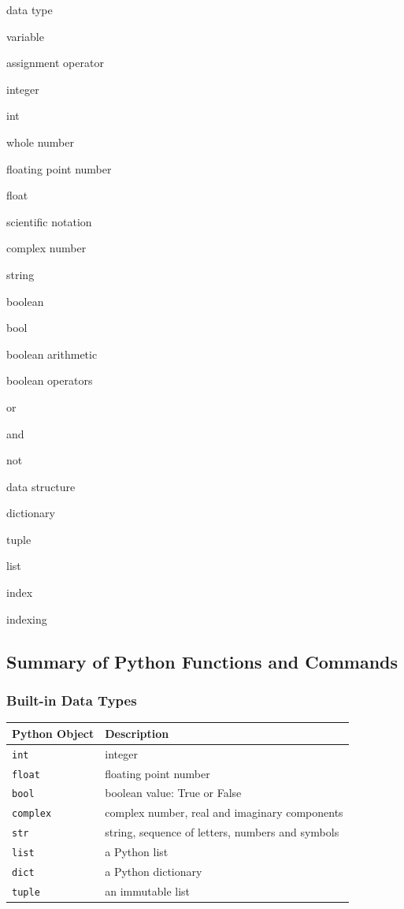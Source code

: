 \documentclass{book}
\newenvironment{key_terms}{\begin{multicols}{3}}{\end{multicols}} %
\begin{document}
    
        \begin{key_terms}
        data type

variable

assignment operator

integer

int

whole number

floating point number

float

scientific notation

complex number

string

boolean

bool

boolean arithmetic

boolean operators

or

and

not

data structure

dictionary

tuple

list

index

indexing
        \end{key_terms}

    




    
        \subsection{Summary of Python Functions and
Commands}\label{summary-of-python-functions-and-commands}
    




    
        \subsubsection{Built-in Data Types}\label{built-in-data-types}

\begin{longtable}[]{@{}ll@{}}
\toprule
Python Object & Description\tabularnewline
\midrule
\endhead
\lstinline!int! & integer\tabularnewline
\lstinline!float! & floating point number\tabularnewline
\lstinline!bool! & boolean value: True or False\tabularnewline
\lstinline!complex! & complex number, real and imaginary
components\tabularnewline
\lstinline!str! & string, sequence of letters, numbers and
symbols\tabularnewline
\lstinline!list! & a Python list\tabularnewline
\lstinline!dict! & a Python dictionary\tabularnewline
\lstinline!tuple! & an immutable list\tabularnewline
\bottomrule
\end{longtable}
\end{document}
